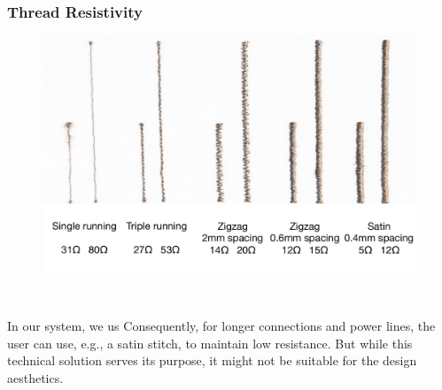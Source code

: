 \subsubsection{Thread Resistivity}
\begin{figure}
\centering
  \includegraphics[width=0.9\columnwidth]{figures/Resistance}
  \caption{}~\label{fig:Resistance}
  \vspace{-2.5em}
\end{figure}



In our system, we us Consequently, for longer connections and power lines, the user can use, e.g., a satin stitch, to maintain low resistance. But while this technical solution serves its purpose, it might not be suitable for the design aesthetics.
 


